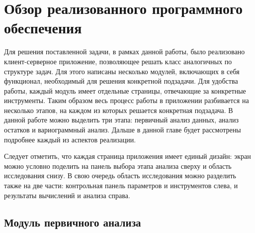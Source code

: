 
\newpage

\chapter{Обзор реализованного программного обеспечения}

Для решения поставленной задачи, в рамках данной работы, было реализовано клиент-серверное приложение, позволяющее решать класс аналогичных по структуре задач. Для этого написаны несколько модулей, включающих в себя функционал, необходимый для решения конкретной подзадачи. Для удобства работы, каждый модуль имеет отдельные страницы, отвечающие за конкретные инструменты. Таким образом весь процесс работы в приложении разбивается на несколько этапов, на каждом из которых решается конкретная подзадача. В данной работе можно выделить три этапа: первичный анализ данных, анализ остатков и вариограммный анализ. Дальше в данной главе будет рассмотрены подробнее каждый из аспектов реализации.

Следует отметить, что каждая страница приложения имеет единый дизайн: экран можно условно поделить на панель выбора этапа анализа сверху и область исследования снизу. В свою очередь область исследования можно разделить также на две части: контрольная панель параметров и инструментов слева, и результаты вычислений и анализа справа.

\section{Модуль первичного анализа} %
\label{sec:mod_basis}

